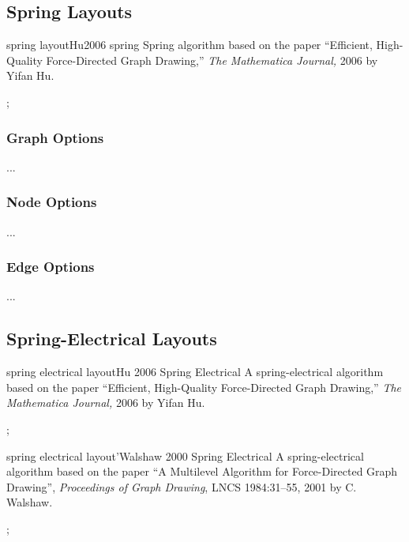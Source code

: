 \subsection{Spring Layouts}


\begin{gdalgorithm}{spring layout}{Hu2006 spring}
  Spring algorithm based on the paper ``Efficient, High-Quality
    Force-Directed Graph Drawing,'' \emph{The Mathematica Journal,}
    2006 by Yifan Hu. 
\begin{codeexample}[]
\tikz {};    
\end{codeexample}
\end{gdalgorithm}

\subsubsection{Graph Options}

...

\subsubsection{Node Options}

...

\subsubsection{Edge Options}

...



\subsection{Spring-Electrical Layouts}


\begin{gdalgorithm}{spring electrical layout}{Hu 2006 Spring Electrical}
  A spring-electrical algorithm based on the paper ``Efficient, High-Quality
    Force-Directed Graph Drawing,'' \emph{The Mathematica Journal,}
    2006 by Yifan Hu. 
\begin{codeexample}[]
\tikz {};    
\end{codeexample}
\end{gdalgorithm}

\begin{gdalgorithm}{spring electrical layout'}{Walshaw 2000 Spring Electrical}
  A spring-electrical algorithm based on the paper ``A Multilevel
  Algorithm for Force-Directed Graph Drawing'', \emph{Proceedings of
    Graph Drawing}, LNCS 1984:31--55, 2001 by C. Walshaw.
\begin{codeexample}[]
\tikz {};    
\end{codeexample}
\end{gdalgorithm}


